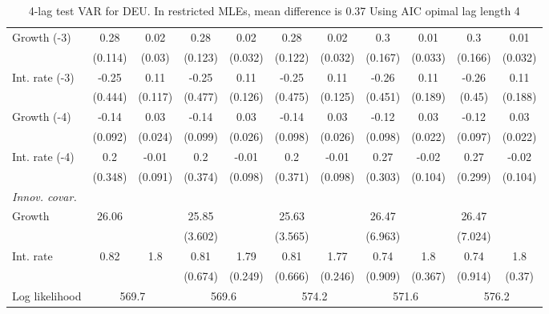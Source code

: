 \begin{table}[htbp]
\begin{tabular}{@{\extracolsep{4pt}}lcccccccccc@{}}
\quad Growth (-3) 	 &0.28 	 & 0.02 	 & 0.28 	 & 0.02 	 & 0.28 	 & 0.02 	 & 0.3 	 & 0.01 	 & 0.3 	 & 0.01	 \\ 
 		 & (0.114) 	 & (0.03) 	 & (0.123) 	 & (0.032) 	 & (0.122) 	 & (0.032) 	 & (0.167) 	 & (0.033) 	 & (0.166) 	 & (0.032) 	 \\ 
\quad Int. rate (-3) 	 &-0.25 	 & 0.11 	 & -0.25 	 & 0.11 	 & -0.25 	 & 0.11 	 & -0.26 	 & 0.11 	 & -0.26 	 & 0.11	 \\ 
 		 & (0.444) 	 & (0.117) 	 & (0.477) 	 & (0.126) 	 & (0.475) 	 & (0.125) 	 & (0.451) 	 & (0.189) 	 & (0.45) 	 & (0.188) 	 \\ 
\quad Growth (-4) 	 &-0.14 	 & 0.03 	 & -0.14 	 & 0.03 	 & -0.14 	 & 0.03 	 & -0.12 	 & 0.03 	 & -0.12 	 & 0.03	 \\ 
 		 & (0.092) 	 & (0.024) 	 & (0.099) 	 & (0.026) 	 & (0.098) 	 & (0.026) 	 & (0.098) 	 & (0.022) 	 & (0.097) 	 & (0.022) 	 \\ 
\quad Int. rate (-4) 	 &0.2 	 & -0.01 	 & 0.2 	 & -0.01 	 & 0.2 	 & -0.01 	 & 0.27 	 & -0.02 	 & 0.27 	 & -0.02	 \\ 
 		 & (0.348) 	 & (0.091) 	 & (0.374) 	 & (0.098) 	 & (0.371) 	 & (0.098) 	 & (0.303) 	 & (0.104) 	 & (0.299) 	 & (0.104) 	 \\ 
\rule{0pt}{4ex} \emph{Innov. covar.}  	 & 	 & 	 & 	 & 	 & 	 & 	 & 	 & 	 & 	 &\\ 
\quad Growth 	 &26.06 	 &  	 & 25.85 	 &  	 & 25.63 	 &  	 & 26.47 	 &  	 & 26.47 	 & 	 \\ 
 		 &  	 &  	 & (3.602) 	 &  	 & (3.565) 	 &  	 & (6.963) 	 &  	 & (7.024) 	 &  	 \\ 
\quad Int. rate 	 &0.82 	 & 1.8 	 & 0.81 	 & 1.79 	 & 0.81 	 & 1.77 	 & 0.74 	 & 1.8 	 & 0.74 	 & 1.8	 \\ 
 		 &  	 &  	 & (0.674) 	 & (0.249) 	 & (0.666) 	 & (0.246) 	 & (0.909) 	 & (0.367) 	 & (0.914) 	 & (0.37) 	 \\ 
 \hline \rule{0pt}{4ex} 
  Log likelihood 	 &\multicolumn{2}{c}{569.7} 	 & \multicolumn{2}{c}{569.6} 	 & \multicolumn{2}{c}{574.2} 	 & \multicolumn{2}{c}{571.6} 	 & \multicolumn{2}{c}{576.2}\\ 

 \hline 	\end{tabular}		\caption{4-lag test VAR for DEU. In restricted MLEs, mean difference is 0.37 Using AIC opimal lag length 4}
		\label{tab:DEUopt_}

\end{table}